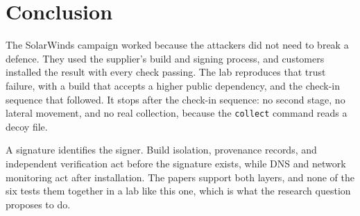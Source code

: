 \section{Conclusion}
\label{sec:conclusion}

The SolarWinds campaign worked because the attackers did not need to break a defence. They used the supplier's build and signing process, and customers installed the result with every check passing. The lab reproduces that trust failure, with a build that accepts a higher public dependency, and the check-in sequence that followed. It stops after the check-in sequence: no second stage, no lateral movement, and no real collection, because the \texttt{collect} command reads a decoy file.

A signature identifies the signer. Build isolation, provenance records, and independent verification act before the signature exists, while DNS and network monitoring act after installation. The papers support both layers, and none of the six tests them together in a lab like this one, which is what the research question proposes to do.
